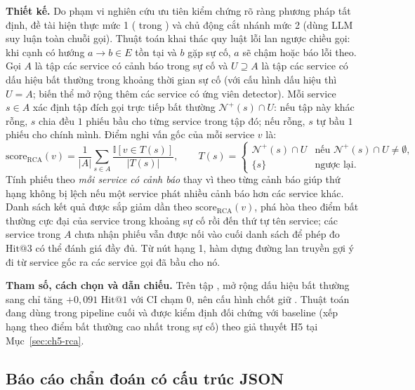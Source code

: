 \textbf{Thiết kế.} Do phạm vi nghiên cứu ưu tiên kiểm chứng rõ ràng phương pháp tất định, đề tài hiện thực mức 1 ( trong ) và chủ động cắt nhánh mức 2 (dùng LLM suy luận toàn chuỗi gọi). Thuật toán khai thác quy luật lỗi lan ngược chiều gọi: khi cạnh có hướng $a \to b \in E$ tồn tại và $b$ gặp sự cố, $a$ sẽ chậm hoặc báo lỗi theo. Gọi $A$ là tập các service có cảnh báo trong sự cố và $U \supseteq A$ là tập các service có dấu hiệu bất thường trong khoảng thời gian sự cố (với cấu hình dấu hiệu  thì $U = A$; biến thể  mở rộng thêm các service có ứng viên detector). Mỗi service $s \in A$ xác định tập đích gọi trực tiếp bất thường $\mathcal{N}^+(s) \cap U$: nếu tập này khác rỗng, $s$ chia đều $1$ phiếu bầu cho từng service trong tập đó; nếu rỗng, $s$ tự bầu $1$ phiếu cho chính mình. Điểm nghi vấn gốc của mỗi service $v$ là:
\begin{equation}
  \text{score}_{\text{RCA}}(v) = \frac{1}{|A|} \sum_{s \in A} \frac{\mathbb{I}[v \in T(s)]}{|T(s)|},
  \qquad
  T(s) =
  \begin{cases}
    \mathcal{N}^+(s) \cap U & \text{nếu } \mathcal{N}^+(s) \cap U \neq \emptyset, \\
    \{s\} & \text{ngược lại.}
  \end{cases}
  \label{eq:ch4-rca-vote}
\end{equation}
Tính phiếu theo \emph{mỗi service có cảnh báo} thay vì theo từng cảnh báo giúp thứ hạng không bị lệch nếu một service phát nhiều cảnh báo hơn các service khác. Danh sách kết quả được sắp giảm dần theo $\text{score}_{\text{RCA}}(v)$, phá hòa theo điểm bất thường cực đại của service trong khoảng sự cố rồi đến thứ tự tên service; các service trong $A$ chưa nhận phiếu vẫn được nối vào cuối danh sách để phép đo $\text{Hit}@3$ có thể đánh giá đầy đủ. Từ nút hạng 1, hàm  dựng đường lan truyền gợi ý đi từ service gốc ra các service gọi đã bầu cho nó.

\textbf{Tham số, cách chọn và dẫn chiếu.} Trên tập , mở rộng dấu hiệu bất thường sang  chỉ tăng $+0{,}091$ $\text{Hit}@1$ với CI chạm $0$, nên cấu hình chốt giữ . Thuật toán đang dùng trong pipeline cuối và được kiểm định đối chứng với baseline  (xếp hạng theo điểm bất thường cao nhất trong sự cố) theo giả thuyết H5 tại Mục~\ref{sec:ch5-rca}.

\subsection{Báo cáo chẩn đoán có cấu trúc JSON}
\label{sec:ch4-report}

